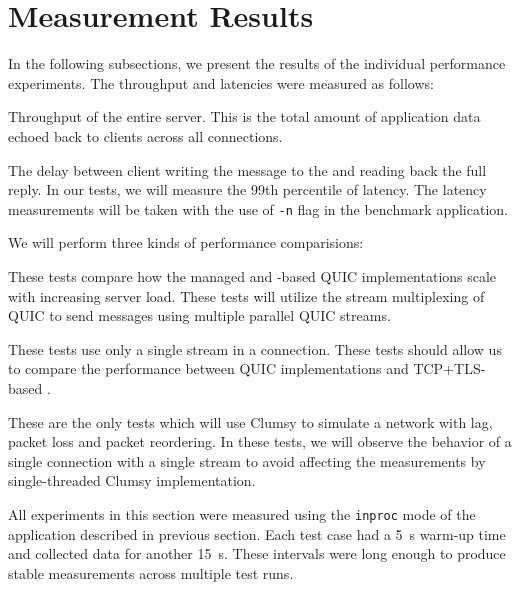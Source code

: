 \section{Measurement Results}\label{sec:04-perf-results}

In the following subsections, we present the results of the individual performance experiments. The
throughput and latencies were measured as follows:

\begin{itemize}

   Throughput of the entire server. This is the total amount of application data
  echoed back to clients across all connections.

   The delay between client writing the message to the \Stream{} and reading back the
full reply. In our tests, we will measure the 99th percentile of latency. The latency measurements
will be taken with the use of \texttt{-n} flag in the benchmark application.

\end{itemize}

We will perform three kinds of performance comparisions:

\begin{itemize}

   These tests compare how the managed and
\libmsquic{}-based QUIC implementations scale with increasing server load. These tests will utilize
the stream multiplexing of QUIC to send messages using multiple parallel QUIC streams.

   These tests use only a single stream in a connection. These
tests should allow us to compare the performance between QUIC implementations and TCP+TLS-based
\SslStream{}.

   These are the only tests which will use Clumsy
to simulate a network with lag, packet loss and packet reordering. In these tests, we will observe
the behavior of a single connection with a single stream to avoid affecting the measurements by
single-threaded Clumsy implementation.

\end{itemize}

All experiments in this section were measured using the \texttt{inproc} mode of the application
described in previous section. Each test case had a \SI{5}{\second} warm-up time and collected data
for another \SI{15}{\second}. These intervals were long enough to produce stable measurements across
multiple test runs.

